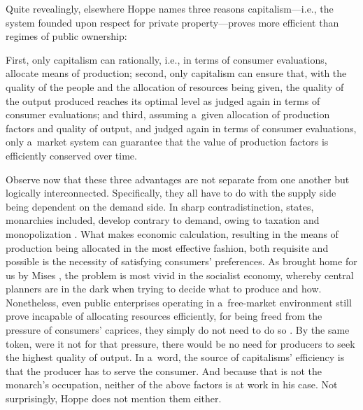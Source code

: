 Quite revealingly, elsewhere Hoppe 
\parencite*[][p.192]{hoppe_theory_2016} %
 names three reasons capitalism---i.e., the system founded upon respect for private property---proves more efficient than regimes of public ownership:



First, only capitalism can rationally, i.e., in terms of consumer evaluations, allocate means of production; second, only capitalism can ensure that, with the quality of the people and the allocation of resources being given, the quality of the output produced reaches its optimal level as judged again in terms of consumer evaluations; and third, assuming a~given allocation of production factors and quality of output, and judged again in terms of consumer evaluations, only a~market system can guarantee that the value of production factors is efficiently conserved over time.



Observe now that these three advantages are not separate from one another but logically interconnected. Specifically, they all have to do with the supply side being dependent on the demand side. In sharp contradistinction, states, monarchies included, develop contrary to demand, owing to taxation and monopolization 
\parencite[][pp.49–52]{hoppe_economics_2006}. %
 What makes economic calculation, resulting in the means of production being allocated in the most effective fashion, both requisite and possible is the necessity of satisfying consumers' preferences. As brought home for us by Mises 
\parencite*[][]{mises_economic_2012}, %
 the problem is most vivid in the socialist economy, whereby central planners are in the dark when trying to decide what to produce and how. Nonetheless, even public enterprises operating in a~free-market environment still prove incapable of allocating resources efficiently, for being freed from the pressure of consumers' caprices, they simply do not need to do so 
\parencites[][]{mises_bureaucracy_1944}[][pp.952–953]{rothbard_man_2009}. %
 By the same token, were it not for that pressure, there would be no need for producers to seek the highest quality of output. In a~word, the source of capitalisms' efficiency is that the producer has to serve the consumer. And because that is not the monarch's occupation, neither of the above factors is at work in his case. Not surprisingly, Hoppe does not mention them either.



